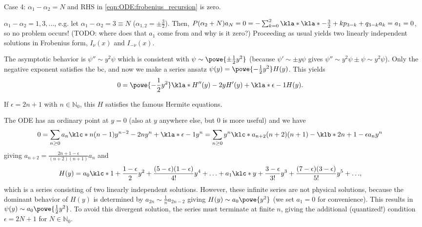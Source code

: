 \documentclass[english, parskip=full]{scrbook}
\newcommand{\note}[1]{\begin{tcolorbox}[colback=colorbackgroundnote,colframe=colornote, breakable,enhanced]#1\end{tcolorbox}}
\newcommand{\example}[3]{\begin{tcolorbox}[colback=colorbackgroundexample,colframe=colorexample, breakable,enhanced,title={\textbf{#1}: #2.}]#3\end{tcolorbox}}
\begin{document}
Case 4: $\alpha_1-\alpha_2=N$ and RHS in \autoref{eqn:ODE:frobenius_recursion} is zero.
\example{Modified Bessel function}{order $\nu=\frac{1}{2},\frac{3}{2},\dots$}{$\alpha_1-\alpha_2=1,3,\dots$, e.g. let $\alpha_1-\alpha_2=3\equiv N$ ($\alpha_{1,2} = \pm \frac{3}{2}$).
Then, $P(\alpha_2+N)a_N = 0 = -\sum_{k=0}^2 \kla*{\kla*{-\frac{3}{2}+k}p_{3-k} + q_{3-k}}a_k = a_1 = 0$, so no problem occurs! (TODO: where does that $a_1$ come from and why is it zero?)
Proceeding as usual yields two linearly independent solutions in Frobenius form, $I_\nu(x)$ and $I_{-\nu}(x)$.
}
\example{Quantum harmonic oscillator}{$\psi'' + \kla*{\epsilon - y^2}\psi = 0$ with \gls{bc} $\psi \rightarrow 0$ as $|y|\rightarrow\infty$}{The asymptotic behavior is $\psi'' \sim y^2\psi$ which is consistent with $\psi\sim \powe{\pm \frac{1}{2}y^2}$ (because $\psi' \sim \pm y\psi$ gives $\psi'' \sim y^2\psi \pm \psi \sim y^2\psi$).
Only the negative exponent satisfies the \gls{bc}, and now we make a series ansatz $\psi(y) = \powe{-\frac{1}{2}y^2}H(y)$.
This yields
\begin{align}
0 &= \powe{-\frac{1}{2}y^2} \kla*{H''(y) - 2yH'(y) + \kla*{\epsilon-1}H(y)}.
\end{align}
\note{If $\epsilon=2n+1$ with $n\in\mathbb{N}_0$, this $H$ satisfies the famous Hermite equations.}
The ODE has an ordinary point at $y=0$ (also at $y$ anywhere else, but $0$ is more useful) and we have
\begin{align}
0 &= \sum_{n\ge 0} a_n \klc*{n(n-1)y^{n-2} - 2ny^n + \kla*{\epsilon-1}y^n} = \sum_{n\ge 0} y^n \klc*{a_{n+2} (n+2)(n+1) - \klb*{2n+1 - \epsilon} a_n} y^n
\end{align}
giving $a_{n+2} = \frac{2n+1-\epsilon}{(n+2)(n+1)}a_{n}$ and
\begin{align}
H(y) &= a_0 \klc*{1 + \frac{1-\epsilon}{2}y^2 + \frac{(5-\epsilon)(1-\epsilon)}{4!}y^4 + \dots} + a_1 \klc*{y + \frac{3-\epsilon}{3!}y^3 + \frac{(7-\epsilon)(3-\epsilon)}{5!}y^5 + \dots},
\end{align}
which is a series consisting of two linearly independent solutions.
However, these infinite series are not physical solutions, because the dominant behavior of $H(y)$ is determined by $a_{2n} \sim \frac{1}{n} a_{2n-2}$ giving $H(y) \sim a_0 \powe{y^2}$ (we set $a_1=0$ for convenience).
This results in $\psi(y)\sim a_0\powe{\frac{1}{2}y^2}$.
To avoid this divergent solution, the series must terminate at finite $n$, giving the additional (quantized!) condition $\epsilon=2N+1$ for $N\in\mathbb{N}_0$.
}
\end{document}
